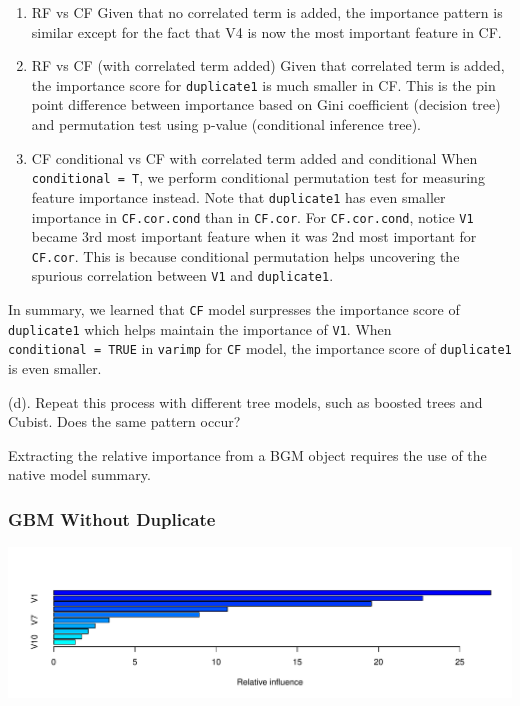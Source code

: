 \documentclass[]{report}
\begin{document}
\begin{enumerate}
\def\labelenumi{\arabic{enumi}.}
\item
  RF vs CF Given that no correlated term is added, the importance
  pattern is similar except for the fact that V4 is now the most
  important feature in CF.
\item
  RF vs CF (with correlated term added) Given that correlated term is
  added, the importance score for \texttt{duplicate1} is much smaller in
  CF. This is the pin point difference between importance based on Gini
  coefficient (decision tree) and permutation test using p-value
  (conditional inference tree).
\item
  CF conditional vs CF with correlated term added and conditional When
  \texttt{conditional\ =\ T}, we perform conditional permutation test
  for measuring feature importance instead. Note that
  \texttt{duplicate1} has even smaller importance in
  \texttt{CF.cor.cond} than in \texttt{CF.cor}. For
  \texttt{CF.cor.cond}, notice \texttt{V1} became 3rd most important
  feature when it was 2nd most important for \texttt{CF.cor}. This is
  because conditional permutation helps uncovering the spurious
  correlation between \texttt{V1} and \texttt{duplicate1}.
\end{enumerate}

In summary, we learned that \texttt{CF} model surpresses the importance
score of \texttt{duplicate1} which helps maintain the importance of
\texttt{V1}. When \texttt{conditional\ =\ TRUE} in \texttt{varimp} for
\texttt{CF} model, the importance score of \texttt{duplicate1} is even
smaller.

\begin{subquestion}{(d).} Repeat this process with different tree models, such as boosted trees and Cubist. Does the same pattern occur?\end{subquestion}

Extracting the relative importance from a BGM object requires the use of
the native model summary.

\hypertarget{gbm-without-duplicate}{%
\subsubsection{GBM Without Duplicate}\label{gbm-without-duplicate}}

\includegraphics{Homework-Two_files/figure-latex/kj-8.1d-1.pdf}
\end{document}
